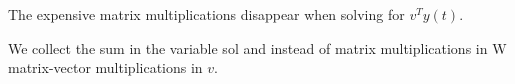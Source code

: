 \documentclass[a4paper,12pt]{article}
\begin{document}



The expensive matrix multiplications disappear when solving for $v^{T}y(t)$.

\begin{julia}
  We collect the sum in the variable sol and instead of matrix multiplications in W
  matrix-vector multiplications in $v$.

\end{julia}

\end{document}
